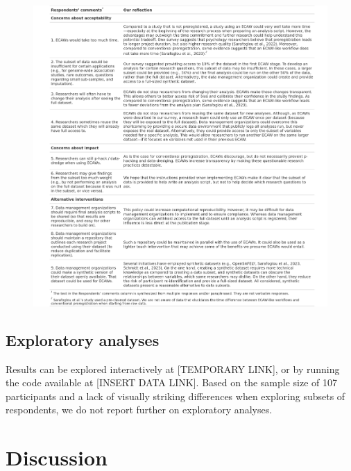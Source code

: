 \documentclass[
  man,floatsintext]{apa6}
\begin{document}
\begin{figure}

{\centering \includegraphics[width=1\linewidth]{figs/open-ended-table_figure} 

}

\caption{ }\label{fig:openEndedTable}
\end{figure}

\hypertarget{exploratory-analyses}{%
\subsection{Exploratory analyses}\label{exploratory-analyses}}

Results can be explored interactively at {[}TEMPORARY LINK{]}, or by running the code available at {[}INSERT DATA LINK{]}. Based on the sample size of 107 participants and a lack of visually striking differences when exploring subsets of respondents, we do not report further on exploratory analyses.

\hypertarget{discussion}{%
\section{Discussion}\label{discussion}}
\end{document}
